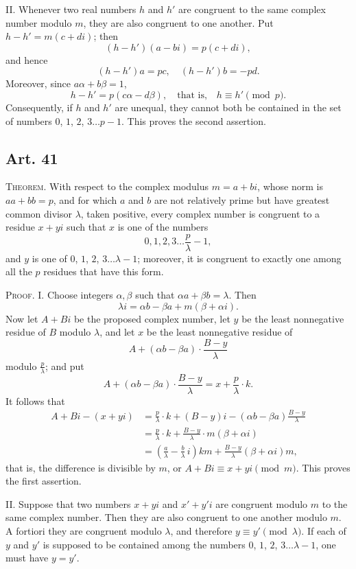\documentclass[12pt]{article}
\newcommand{\art}[1]{\subsection*{Art. #1}}
\begin{document}
II. Whenever two real numbers $h$ and $h'$ are congruent to the same complex number modulo $m$, they are also congruent to one another. Put $h-h'=m(c+di)$; then
\[
(h-h')(a-bi)=p(c+di),
\]
and hence
\[
(h-h')a=pc,\quad (h-h')b=-pd.
\]
Moreover, since $a\alpha+b\beta=1$,
\[
h-h'=p(c\alpha-d\beta),\quad \text{that is,}\quad h\equiv h' \pmod{p}.
\]
Consequently, if $h$ and $h'$ are unequal, they cannot both be contained in the set of numbers $0$, $1$, $2$, $3\ldots p-1$. This proves the second assertion.

\art{41}

\noindent\textsc{Theorem.} With respect to the complex modulus $m=a+bi$, whose norm is $aa+bb=p$, and for which $a$ and $b$ are not relatively prime but have greatest common divisor $\lambda$, taken positive, every complex number is congruent to a residue $x+yi$ such that $x$ is one of the numbers
\[
0,1,2,3\ldots \frac{p}{\lambda}-1,
\]
and $y$ is one of $0$, $1$, $2$, $3\ldots \lambda-1$; moreover, it is congruent to exactly one among all the $p$ residues that have this form.

\medskip
\noindent\textsc{Proof.} I. Choose integers $\alpha,\beta$ such that $\alpha a+\beta b=\lambda$. Then
\[
\lambda i=\alpha b-\beta a+m(\beta+\alpha i).
\]
Now let $A+Bi$ be the proposed complex number, let $y$ be the least nonnegative residue of $B$ modulo $\lambda$, and let $x$ be the least nonnegative residue of
\[
A+(\alpha b-\beta a)\cdot\frac{B-y}{\lambda}
\]
modulo $\frac{p}{\lambda}$; and put
\[
A+(\alpha b-\beta a)\cdot\frac{B-y}{\lambda}=x+\frac{p}{\lambda}\cdot k.
\]
It follows that
\[
\begin{aligned}
A+Bi-(x+yi)
&=\frac{p}{\lambda}\cdot k+(B-y)i-(\alpha b-\beta a)\frac{B-y}{\lambda}\\
&=\frac{p}{\lambda}\cdot k+\frac{B-y}{\lambda}\cdot m(\beta+\alpha i)\\
&=\left(\frac{a}{\lambda}-\frac{b}{\lambda}\,i\right)km+\frac{B-y}{\lambda}(\beta+\alpha i)m,
\end{aligned}
\]
that is, the difference is divisible by $m$, or $A+Bi\equiv x+yi \pmod{m}$. This proves the first assertion.

II. Suppose that two numbers $x+yi$ and $x'+y'i$ are congruent modulo $m$ to the same complex number. Then they are also congruent to one another modulo $m$. A fortiori they are congruent modulo $\lambda$, and therefore $y\equiv y' \pmod{\lambda}$. If each of $y$ and $y'$ is supposed to be contained among the numbers $0$, $1$, $2$, $3\ldots \lambda-1$, one must have $y=y'$.
\end{document}
